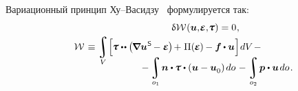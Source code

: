 \begin{otherlanguage}{russian}
Вариационный принцип Ху\hbox{--}Васидзу~\cite{washizu} %
формулируется так:
\nopagebreak\vspace{0.1em}\begin{multline}\label{huwashizuvariationalprinciple}
\hfil \variation{\mathcal{W}} \hspace{0.1ex} (\bm{u}, \hspace{-0.32ex}\mathboldepsilon, \hspace{-0.32ex}\mathboldtau) = 0 \hspace{0.1ex},\\[-0.1em]
%
\shoveleft{\displaystyle \mathcal{W} \hspace{0.2ex} \equiv
\integral\displaylimits_V \hspace{-0.4ex}
\left[^{\mathstrut} \hspace{-0.2ex}
\mathboldtau \dotdotp \hspace{-0.4ex} \left( \hspace{-0.2ex} \boldnabla {\bm{u}}^{\hspace{0.08ex}\mathsf{S}} \hspace{-0.2ex} - \mathboldepsilon \hspace{-0.1ex} \right) \hspace{-0.25ex} + \hspace{0.1ex} \Pi(\hspace{-0.1ex}\mathboldepsilon\hspace{-0.1ex})\hspace{-0.1ex} -
\bm{f} \hspace{-0.1ex} \dotp \bm{u}
\hspace{0.1ex} \right] \hspace{-0.25ex} dV \hspace{0.2ex} - \hfill} \\[-1.2em]
%
\hspace{8em} \displaystyle - \integral\displaylimits_{o_1} \hspace{-0.25ex} \bm{n} \dotp \hspace{-0.1ex} \mathboldtau \dotp \left( \bm{u} - \bm{u}_{\raisemath{-0.1em}{0}} \right) \hspace{-0.1ex} do \hspace{0.2ex} -
\integral\displaylimits_{o_2} \hspace{-0.2ex} \bm{p} \dotp \bm{u} \hspace{0.25ex} do \hspace{0.2ex}.
\end{multline}


\end{otherlanguage}
